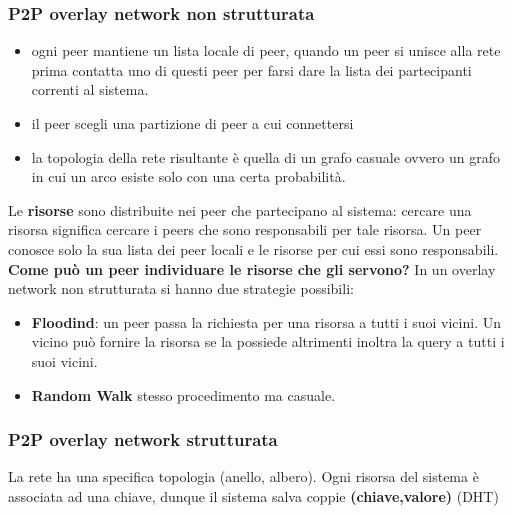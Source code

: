 \documentclass[12pt]{article}
\begin{document}
 	\subsubsection{P2P overlay network non strutturata}
 	\begin{itemize}
 		\item ogni peer mantiene un lista locale di peer, quando un peer si unisce alla rete prima contatta uno di questi peer per farsi dare la lista dei partecipanti correnti al sistema.
 		\item il peer scegli una partizione di peer a cui connettersi
 		\item la topologia della rete risultante è quella di un grafo casuale ovvero un grafo in cui un arco esiste solo con una certa probabilità. 
 	\end{itemize}
 	Le \textbf{risorse} sono distribuite nei peer che partecipano al sistema: cercare una risorsa significa cercare i peers che sono responsabili per tale risorsa. Un peer conosce solo la sua lista dei peer locali e le risorse per cui essi sono responsabili. \textbf{Come può un peer individuare le risorse che gli servono?}
 	In un overlay network non strutturata si hanno due strategie possibili:
 	\begin{itemize}
 		\item \textbf{Floodind}: un peer passa la richiesta per una risorsa a tutti i suoi vicini. Un vicino può fornire la risorsa se la possiede altrimenti inoltra la query a tutti i suoi vicini.
 		\item \textbf{Random Walk} stesso procedimento ma casuale.
 	\end{itemize}
 	\subsubsection{P2P overlay network strutturata}
 		La rete ha una specifica topologia (anello, albero). Ogni risorsa del sistema è associata ad una chiave, dunque il sistema salva  coppie \textbf{(chiave,valore)} (DHT)
 		
\end{document}
